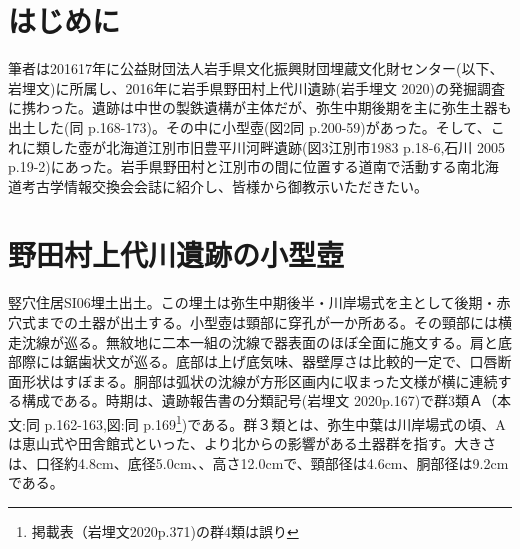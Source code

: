 \documentclass[a4j,11pt,twocolumn,openany]{jsbook}
\begin{document}
\section{はじめに}
筆者は201617年に公益財団法人岩手県文化振興財団埋蔵文化財センター(以下、岩埋文)に所属し、2016年に岩手県野田村上代川遺跡(岩手埋文 2020)の発掘調査に携わった。遺跡は中世の製鉄遺構が主体だが、弥生中期後期を主に弥生土器も出土した(同 p.168-173)。その中に小型壺(図2同 p.200-59)があった。そして、これに類した壺が北海道江別市旧豊平川河畔遺跡(図3江別市1983 p.18-6,石川 2005 p.19-2)にあった。岩手県野田村と江別市の間に位置する道南で活動する南北海道考古学情報交換会会誌に紹介し、皆様から御教示いただきたい。

\section{野田村上代川遺跡の小型壺}\label{nodamura}
竪穴住居SI06埋土出土。この埋土は弥生中期後半・川岸場式を主として後期・赤穴式までの土器が出土する。小型壺は頸部に穿孔が一か所ある。その頸部には横走沈線が巡る。無紋地に二本一組の沈線で器表面のほぼ全面に施文する。肩と底部際には鋸歯状文が巡る。底部は上げ底気味、器壁厚さは比較的一定で、口唇断面形状はすぼまる。胴部は弧状の沈線が方形区画内に収まった文様が横に連続する構成である。時期は、遺跡報告書の分類記号(岩埋文 2020p.167)で群3類Ａ（本文:同 p.162-163,図:同 p.169\footnote{
	掲載表（岩埋文2020p.371)の群4類は誤り
})である。群３類とは、弥生中葉は川岸場式の頃、Aは恵山式や田舎館式といった、より北からの影響がある土器群を指す。大きさは、口径約4.8cm、底径5.0cm、、高さ12.0cmで、頸部径は4.6cm、胴部径は9.2cmである。
\end{document}
